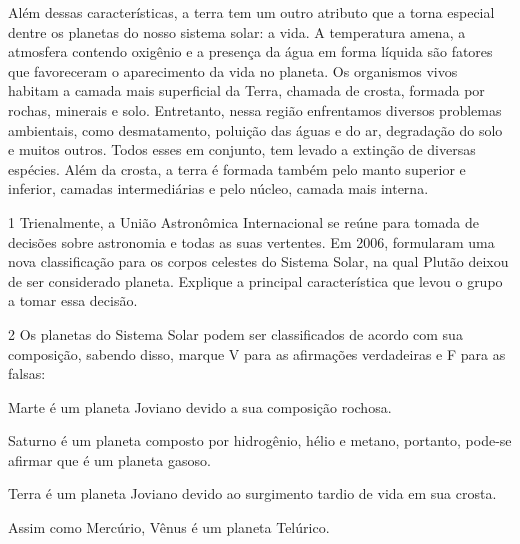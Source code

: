 {Além dessas características, a terra tem um outro atributo que a torna
especial dentre os planetas do nosso sistema solar: a vida. A
temperatura amena, a atmosfera contendo oxigênio e a presença da água em
forma líquida são fatores que favoreceram o aparecimento da vida no
planeta. Os organismos vivos habitam a camada mais superficial da Terra,
chamada de crosta, formada por rochas, minerais e solo. Entretanto,
nessa região enfrentamos diversos problemas ambientais, como
desmatamento, poluição das águas e do ar, degradação do solo e muitos
outros. Todos esses em conjunto, tem levado a extinção de diversas
espécies. Além da crosta, a terra é formada também pelo manto superior e
inferior, camadas intermediárias e pelo núcleo, camada mais interna.}


\num{1}  Trienalmente, a União Astronômica Internacional se reúne para tomada
  de decisões sobre astronomia e todas as suas vertentes. Em 2006,
  formularam uma nova classificação para os corpos celestes do Sistema
  Solar, na qual Plutão deixou de ser considerado planeta. Explique a
  principal característica que levou o grupo a tomar essa decisão.



\num{2} Os planetas do Sistema Solar podem ser classificados de acordo com sua
  composição, sabendo disso, marque V para as afirmações verdadeiras e F
  para as falsas:

\begin{boxlist}
\item Marte é um planeta Joviano devido a sua composição rochosa. 

\item Saturno é um planeta composto por hidrogênio, hélio e metano,
portanto, pode-se afirmar que é um planeta gasoso. 

\item Terra é um planeta Joviano devido ao surgimento tardio de vida em
sua crosta. 

\item Assim como Mercúrio, Vênus é um planeta Telúrico. 
\end{boxlist}

